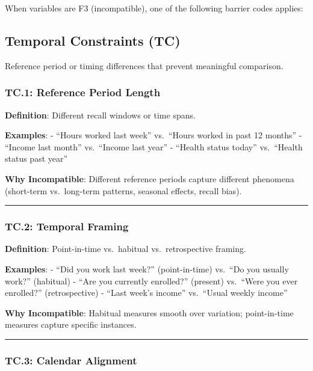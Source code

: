 \documentclass[
  letterpaper,
]{report}
\begin{document}
When variables are F3 (incompatible), one of the following barrier codes
applies:

\subsection{Temporal Constraints (TC)}\label{temporal-constraints-tc-1}

Reference period or timing differences that prevent meaningful
comparison.

\subsubsection{TC.1: Reference Period
Length}\label{tc.1-reference-period-length}

\textbf{Definition}: Different recall windows or time spans.

\textbf{Examples}: - ``Hours worked last week'' vs.~``Hours worked in
past 12 months'' - ``Income last month'' vs.~``Income last year'' -
``Health status today'' vs.~``Health status past year''

\textbf{Why Incompatible}: Different reference periods capture different
phenomena (short-term vs.~long-term patterns, seasonal effects, recall
bias).

\begin{center}\rule{0.5\linewidth}{0.5pt}\end{center}

\subsubsection{TC.2: Temporal Framing}\label{tc.2-temporal-framing}

\textbf{Definition}: Point-in-time vs.~habitual vs.~retrospective
framing.

\textbf{Examples}: - ``Did you work last week?'' (point-in-time)
vs.~``Do you usually work?'' (habitual) - ``Are you currently
enrolled?'' (present) vs.~``Were you ever enrolled?'' (retrospective) -
``Last week's income'' vs.~``Usual weekly income''

\textbf{Why Incompatible}: Habitual measures smooth over variation;
point-in-time measures capture specific instances.

\begin{center}\rule{0.5\linewidth}{0.5pt}\end{center}

\subsubsection{TC.3: Calendar Alignment}\label{tc.3-calendar-alignment}
\end{document}
